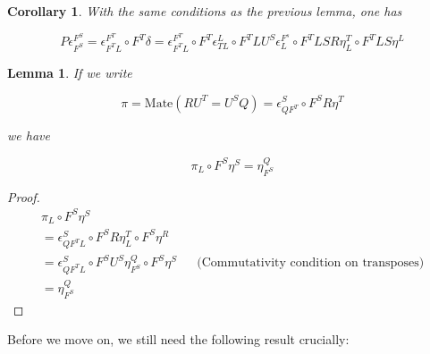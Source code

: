 \documentclass[10pt, oneside]{article}
\newtheorem{lemma}[theorem]{Lemma}
\newtheorem{corollary}[theorem]{Corollary}
\begin{document}
\begin{corollary}\label{thm:comorphism-monads-corollary}
    With the same conditions as the previous lemma, one has

    $$P \epsilon^{F^S}_{F^S} = \epsilon^{F^T}_{F^T L} \circ F^T \delta = \epsilon^{F^T}_{F^T L} \circ F^T \epsilon^L_{TL} \circ F^T L U^S \epsilon^{F^s}_{L} \circ F^T L S R \eta^T_L \circ F^T L S \eta^L$$
\end{corollary}

\begin{lemma}
    If we write

    $$\pi = \mathrm{Mate}(R U^T = U^S Q) = \epsilon^S_{Q F^T} \circ F^S R \eta^T$$

    \noindent we have
    
    $$\pi_L \circ F^S \eta^S = \eta^Q_{F^S}$$
\end{lemma}
\begin{proof}
    \begin{align*}
        \pi_L \circ F^S \eta^S
        \\ = \epsilon^S_{Q F^T L} \circ F^S R \eta^T_L \circ F^S \eta^R
        \\ = \epsilon^S_{Q F^T L} \circ F^S U^S \eta^Q_{F^S} \circ F^S \eta^S && \text{(Commutativity condition on transposes)}
        \\ = \eta^Q_{F^S}
    \end{align*}
\end{proof}

Before we move on, we still need the following result crucially:
\end{document}
